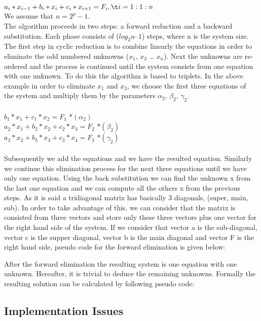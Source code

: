 $a_i*x_{i-1} + b_i*x_i+c_i*x_{i+1} = F_{i} ,\t  i=1:1:n$\\
We assume that $n= 2^p - 1$. \\
The algorithm proceeds in two steps: a forward reduction and a backward substitution. Each phase consists of ($log_2n – 1$) steps, where n is the system size. The first step in cyclic reduction is to combine linearly the equations in order to eliminate the odd numbered unknowns ($x_1$, $x_3$ … $x_n$). Next the unknowns are re-ordered and the process is continued until the system consists from one equation with one unknown. To do this the algorithm is based to triplets. In the above example in order to eliminate $x_1$ and $x_3$, we choose the first three equations of the system and multiply them by the parameters $\alpha_2$, $\beta_2$, $\gamma_2$. \\ \\
$b_1*x_1+c_1*x_2= F_1$                         \hspace*{5cm}$*(\alpha_2)$\\
$a_2*x_1+ b_2*x_2+c_2*x_3= F_2$                 \hspace*{3,3cm}$*(\beta_2)$ \\
\hspace*{2cm}$a_3*x_2+ b_3*x_3+c_3*x_4= F_3$     \hspace*{1,3cm}$*(\gamma_2)$\\
\\
Subsequently we add the equations and we have the resulted equation. Similarly we continue this elimination process for the next three equations until we have only one equation.
Using the back substitution we can find the unknown x from the last one equation and we can compute all the others x from the previous steps.
As it is said a tridiagonal matrix has basically 3 diagonals, (super, main, sub). In order to take advantage of this, we can consider that the matrix is consisted from three vectors and store only these three vectors plus one vector for the right hand side of the system.
If we consider that vector a is the sub-diagonal, vector c is the supper diagonal, vector b is the main diagonal and vector F is the right hand side, pseudo code for the forward elimination is given below:

After the forward elimination the resulting system is one equation with one unknown. Hereafter, it is trivial to deduce the remaining unknowns. Formally the resulting solution can be calculated by following pseudo code:


\subsection{Implementation Issues}

